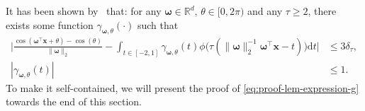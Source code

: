 \documentclass[english]{article}
\begin{document}
%
%
%
%  
It has been shown by~\citet[Lemma~5]{Barron1993Universal} that:  for any ${\bm \omega}\in\mathbb{R}^d$,  $\theta\in[0,2\pi)$ and any $\tau\ge 2$, there exists some function $\gamma_{{\bm \omega},\theta}(\cdot)$  such that
\begin{subequations}\label{eq:proof-lem-expression-g}
\begin{align}\label{eq:proof-lem-expression-temp-2}
\bigg|\frac{\cos(\bm{\omega}^{\top}{\bm x} + \theta) - \cos(\theta)}{\|\bm{\omega}\|_2} - \int_{t\in[-2, 1]} \gamma_{\bm{\omega}, \theta}(t)\phi\big(\tau(\|\bm{\omega}\|_2^{-1}\bm{\omega}^{\top}{\bm x} - t)\big)\mathrm{d}t\bigg| &\le 3\delta_{\tau}, \\
|\gamma_{\bm{\omega}, \theta}(t)| &\le 1. \label{eq:proof-lem-expression-int-gamma}
\end{align}
\end{subequations}
%
To make it self-contained, we will present the proof of \eqref{eq:proof-lem-expression-g} towards the end of this section. 
%
%
\end{document}
